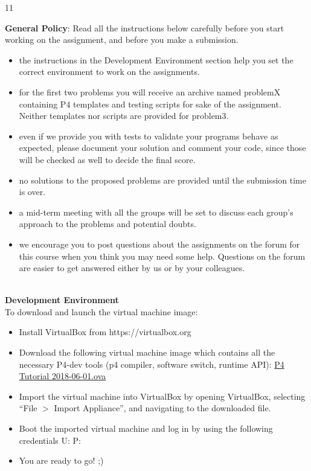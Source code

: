 11\documentclass[a4 paper]{article}
\begin{document}
\textbf{General Policy}: Read all the instructions below carefully before you start working on the assignment, and before you make a submission.
\begin{itemize}
    \item the instructions in the Development Environment section help you set the correct environment to work on the assignments.
    \item for the first two problems you will receive an archive named problemX containing P4 templates and testing scripts for sake of the assignment. Neither templates nor scripts are provided for problem3.
    \item even if we provide you with tests to validate your programs behave as expected, please document your solution and comment your code, since those will be checked as well to decide the final score.
    \item no solutions to the proposed problems are provided until the submission time is over.
    \item a mid-term meeting with all the groups will be set to discuss each group's approach to the problems and potential doubts.
    \item we encourage you to post questions about the assignments on the forum for this course when you think you may need some help. Questions on the forum are easier to get answered either by us or by your colleagues.
\end{itemize}
~\\
\textbf{Development Environment}\\
To download and launch the virtual machine image:
\begin{itemize}
    \item Install VirtualBox from https://virtualbox.org 
    \item Download the following virtual machine image which contains all the necessary P4-dev tools (p4 compiler, software switch, runtime API): \href{https://drive.google.com/uc?id=1f22-DYlUV33DsR88_MeMb4s7-1NX_ams&export=download}{P4 Tutorial 2018-06-01.ova}
    \item Import the virtual machine into VirtualBox by opening VirtualBox, selecting “File $>$ Import Appliance”, and navigating to the downloaded file.
    \item Boot the imported virtual machine and log in by using the following credentials U: P:
    \item You are ready to go! ;)
\end{itemize}

\newpage



\newpage



\newpage


\end{document}

